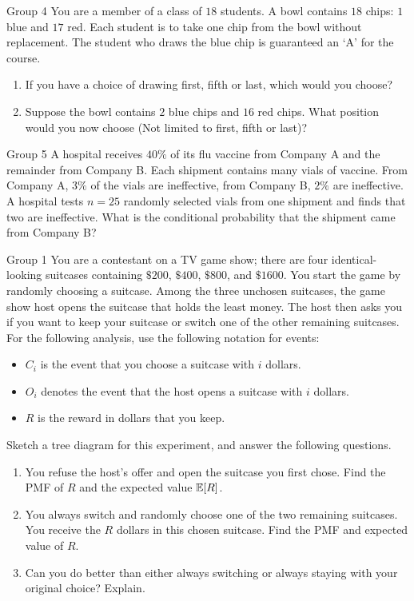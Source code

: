 \documentclass{article}
\begin{document}
\begin{problem}
    {Group 4}
    You are a member of a class of $18$ students. A bowl contains $18$ chips: $1$ blue and $17$ red. Each student is to take one chip from the bowl without replacement. The student who draws the blue chip is guaranteed an `A' for the course.
    \begin{enumerate}
        \item If you have a choice of drawing first, fifth or last, which would you choose?
        \item Suppose the bowl contains $2$ blue chips and $16$ red chips. What position would you now choose (Not limited to first, fifth or last)?
    \end{enumerate}
\end{problem}

\begin{problem}
    {Group 5}
    A hospital receives $40\%$ of its flu vaccine from Company A and the remainder from Company B. Each shipment contains many vials of vaccine. From Company A, $3\%$ of the vials are ineffective, from Company B, $2\%$ are ineffective. A hospital tests $n=25$ randomly selected vials from one shipment and finds that two are ineffective. What is the conditional probability that the shipment came from Company B?
\end{problem}
\begin{problem}
    {Group 1}
    You are a contestant on a TV game show; there are four identical-looking suitcases containing $\$200$, $\$400$, $\$800$, and $\$1600$. You start the game by randomly choosing a suitcase. Among the three unchosen suitcases, the game show host opens the suitcase that holds the least money. The host then asks you if you want to keep your suitcase or switch one of the other remaining suitcases. For the following analysis, use the following notation for events:
    \begin{itemize}
        \item $C_i$ is the event that you choose a suitcase with $i$ dollars.
        \item $O_i$ denotes the event that the host opens a suitcase with $i$ dollars.
        \item $R$ is the reward in dollars that you keep.
    \end{itemize}
    Sketch a tree diagram for this experiment, and answer the following questions.
    \begin{enumerate}
        \item You refuse the host’s offer and open the suitcase you first chose. Find the PMF of $R$ and the expected value $\E{R}$.
        \item You always switch and randomly choose one of the two remaining suitcases. You receive the $R$ dollars in this chosen suitcase. Find the PMF and expected value of $R$.
        \item Can you do better than either always switching or always staying with your original choice? Explain.
    \end{enumerate}
\end{problem}
\end{document}
